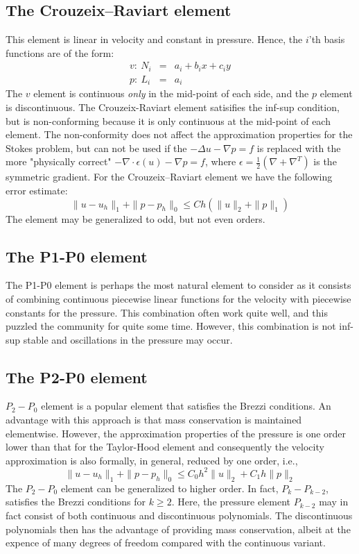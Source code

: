 \subsection{The Crouzeix--Raviart element}
This element is linear in velocity and constant in pressure. Hence, the $i$'th basis functions are of the form:
\begin{eqnarray*}
v:\ N_i &=& a_i + b_i x + c_i y\\
p:\ L_i &=& a_i
\end{eqnarray*}
The $v$ element is continuous \emph{only} in the mid-point of each side, and the $p$ element is discontinuous. The Crouzeix-Raviart element satisifies 
the inf-sup condition, but is non-conforming because it is only continuous at the mid-point of each element. The non-conformity 
does not affect the approximation properties for the Stokes problem, but can not be used if the 
$-\Delta u - \nabla p = f$  
is replaced with the more "physically correct"  
$-\nabla \cdot \epsilon(u) - \nabla p = f$, where $\epsilon=\frac{1}{2}(\nabla + \nabla^T)$ is the symmetric gradient.  
For the Crouzeix--Raviart element we have the following error estimate:
\[\|u-u_h\|_1 + \|p-p_h\|_0 \leqslant Ch (\|u\|_{2} + \|p\|_{1})\]
The element may be generalized to odd, but not even orders. 


\subsection{The P1-P0 element}

The P1-P0 element is perhaps the most natural element to consider as it consists of combining continuous piecewise linear functions for the velocity with piecewise constants
for the pressure. This combination often work quite well, and this puzzled the community for quite some time. However, this combination is not inf-sup stable 
and oscillations in the pressure may occur.


\subsection{The P2-P0 element}

$P_2-P_0$ element is a popular element that  satisfies the Brezzi conditions. 
An advantage with this approach is that mass conservation is
maintained elementwise. However, the approximation properties of the pressure is one order lower than that for the Taylor-Hood element
and consequently the velocity approximation is also formally, in general,  reduced by one order, i.e.,  
\[\|u-u_h\|_1 + \|p-p_h\|_0 \leqslant C_0 h^2\|u\|_{2} + C_1 h\|p\|_{2}\]
The $P_2-P_0$ element can be generalized to higher order. 
In fact,  $P_k-P_{k-2}$, satisfies the Brezzi conditions for $k\ge 2$. Here, the pressure element $P_{k-2}$
may in fact consist of both continuous and discontinuous polynomials. 
The discontinuous polynomials then has the advantage of providing 
mass conservation, albeit at the expence of many degrees of freedom 
compared with the continuous variant. 


